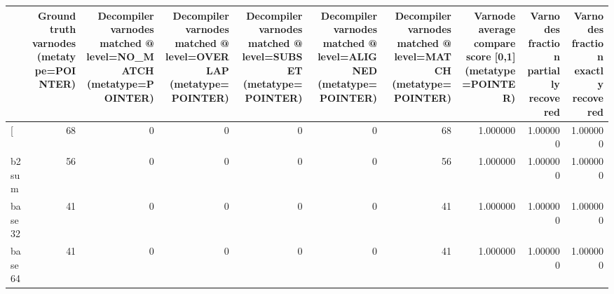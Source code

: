 \begin{tabular}{lrrrrrrrrr}
\toprule
{} &  Ground truth varnodes (metatype=POINTER) &  Decompiler varnodes matched @ level=NO\_MATCH (metatype=POINTER) &  Decompiler varnodes matched @ level=OVERLAP (metatype=POINTER) &  Decompiler varnodes matched @ level=SUBSET (metatype=POINTER) &  Decompiler varnodes matched @ level=ALIGNED (metatype=POINTER) &  Decompiler varnodes matched @ level=MATCH (metatype=POINTER) &  Varnode average compare score [0,1] (metatype=POINTER) &  Varnodes fraction partially recovered &  Varnodes fraction exactly recovered \\
\midrule
[         &                                        68 &                                                  0 &                                                  0 &                                                  0 &                                                  0 &                                                 68 &                                           1.000000 &                               1.000000 &                             1.000000 \\
b2sum     &                                        56 &                                                  0 &                                                  0 &                                                  0 &                                                  0 &                                                 56 &                                           1.000000 &                               1.000000 &                             1.000000 \\
base32    &                                        41 &                                                  0 &                                                  0 &                                                  0 &                                                  0 &                                                 41 &                                           1.000000 &                               1.000000 &                             1.000000 \\
base64    &                                        41 &                                                  0 &                                                  0 &                                                  0 &                                                  0 &                                                 41 &                                           1.000000 &                               1.000000 &                             1.000000 \\

\end{tabular}
